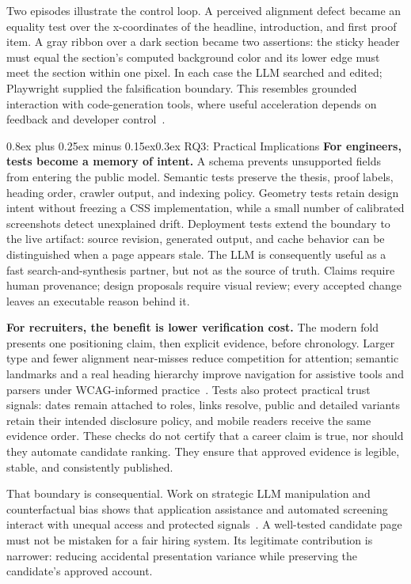 \documentclass[9pt,twocolumn]{extarticle}
\makeatletter
\renewcommand{\section}{\@startsection{section}{1}{0pt}%
  {0.8ex plus 0.25ex minus 0.15ex}{0.3ex}%
  {\normalfont\large\bfseries\color{accent}}}
\makeatother
\begin{document}
Two episodes illustrate the control loop. A perceived alignment defect became an equality test over the x-coordinates of the headline, introduction, and first proof item. A gray ribbon over a dark section became two assertions: the sticky header must equal the section's computed background color and its lower edge must meet the section within one pixel. In each case the LLM searched and edited; Playwright supplied the falsification boundary. This resembles grounded interaction with code-generation tools, where useful acceleration depends on feedback and developer control~\cite{barke2023,peng2023}.

\section{RQ3: Practical Implications}
\textbf{For engineers, tests become a memory of intent.} A schema prevents unsupported fields from entering the public model. Semantic tests preserve the thesis, proof labels, heading order, crawler output, and indexing policy. Geometry tests retain design intent without freezing a CSS implementation, while a small number of calibrated screenshots detect unexplained drift. Deployment tests extend the boundary to the live artifact: source revision, generated output, and cache behavior can be distinguished when a page appears stale. The LLM is consequently useful as a fast search-and-synthesis partner, but not as the source of truth. Claims require human provenance; design proposals require visual review; every accepted change leaves an executable reason behind it.

\textbf{For recruiters, the benefit is lower verification cost.} The modern fold presents one positioning claim, then explicit evidence, before chronology. Larger type and fewer alignment near-misses reduce competition for attention; semantic landmarks and a real heading hierarchy improve navigation for assistive tools and parsers under WCAG-informed practice~\cite{wcag22}. Tests also protect practical trust signals: dates remain attached to roles, links resolve, public and detailed variants retain their intended disclosure policy, and mobile readers receive the same evidence order. These checks do not certify that a career claim is true, nor should they automate candidate ranking. They ensure that approved evidence is legible, stable, and consistently published.

That boundary is consequential. Work on strategic LLM manipulation and counterfactual bias shows that application assistance and automated screening interact with unequal access and protected signals~\cite{cohen2025,yashwant2026}. A well-tested candidate page must not be mistaken for a fair hiring system. Its legitimate contribution is narrower: reducing accidental presentation variance while preserving the candidate's approved account.
\end{document}
